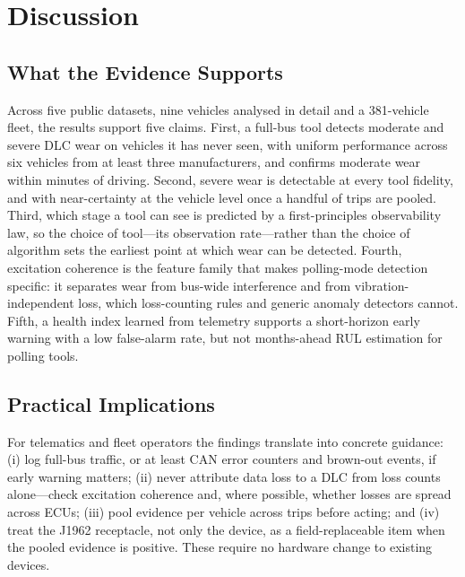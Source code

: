 \section{Discussion}
\label{sec:discussion}

\subsection{What the Evidence Supports}
Across five public datasets, nine vehicles analysed in detail and a
381-vehicle fleet, the results support five claims. First, a full-bus tool
detects moderate and severe DLC wear on vehicles it has never seen, with
uniform performance across six vehicles from at least three manufacturers, and
confirms moderate wear within minutes of driving. Second, severe wear is
detectable at every tool fidelity, and with near-certainty at the vehicle
level once a handful of trips are pooled. Third, which stage a tool can see
is predicted by a first-principles observability law, so the choice of
tool---its observation rate---rather than the choice of algorithm sets the
earliest point at which wear can be detected. Fourth, excitation coherence
is the feature family that makes polling-mode detection specific: it
separates wear from bus-wide interference and from vibration-independent
loss, which loss-counting rules and generic anomaly detectors cannot.
Fifth, a health index learned from telemetry supports a short-horizon early
warning with a low false-alarm rate, but not months-ahead RUL estimation for
polling tools.

\subsection{Practical Implications}
For telematics and fleet operators the findings translate into concrete
guidance: (i) log full-bus traffic, or at least CAN error counters and
brown-out events, if early warning matters; (ii) never attribute data loss
to a DLC from loss counts alone---check excitation coherence and, where
possible, whether losses are spread across ECUs; (iii) pool evidence per
vehicle across trips before acting; and (iv) treat the J1962 receptacle,
not only the device, as a field-replaceable item when the pooled evidence
is positive. These require no hardware change to existing devices.

